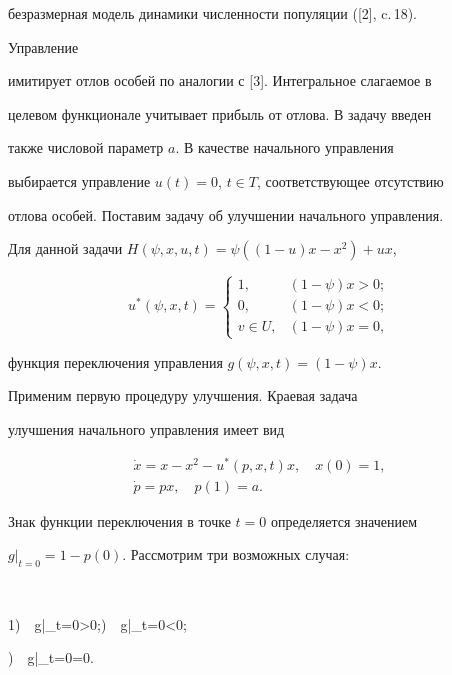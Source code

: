 безразмерная модель динамики численности популяции ([2], c.\,18). 


Управление


имитирует отлов особей по аналогии с [3]. Интегральное слагаемое в


целевом функционале учитывает прибыль от отлова. В задачу введен 


также числовой параметр $a$. В качестве начального управления 


выбирается управление $u(t)=0$, $t\in T$, соответствующее отсутствию 


отлова особей. Поставим задачу об улучшении начального управления. 


Для данной задачи $H(\psi,x,u,t)=\psi((1-u)x-x^2)+u x$,


$$


u^*(\psi,x,t)=


\begin{cases}


1, & (1-\psi)x>0;\\


0, & (1-\psi)x<0;\\


v\in U, & (1-\psi)x=0,


\end{cases}


$$


функция переключения управления $g(\psi,x,t)=(1-\psi)x$.





Применим первую процедуру улучшения. Краевая задача 


улучшения начального управления имеет вид


\begin{gather}


\Dot x=x-x^2-u^*(p,x,t)x,\quad x(0)=1, \\


\Dot p=p x,\quad p(1)=a.


\end{gather}





Знак функции переключения в точке $t=0$ определяется значением 


$g|_{t=0}=1-p(0)$. Рассмотрим три возможных случая:


$$


1)\ \, g|_{t=0}>0;)\ \, g|_{t=0}<0;


)\ \, g|_{t=0}=0.


